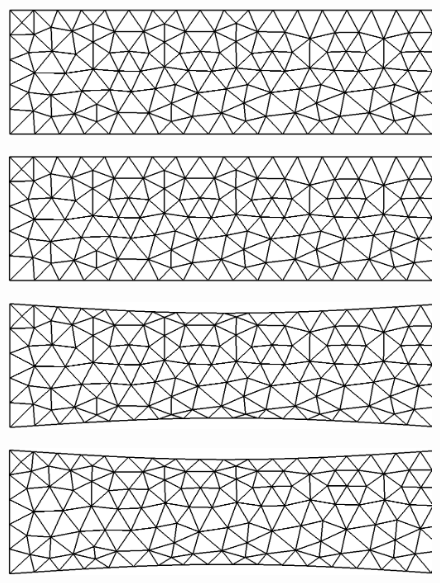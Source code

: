 \begin{figure}[H]
     \begin{minipage}{.50\linewidth}
      \centering
      \includegraphics[scale=0.19]{./02_chaps/cap_numerico/figure/no1.png}\\
     \end{minipage}%
     \begin{minipage}{.50\linewidth}
      \centering
      \includegraphics[scale=0.19]{./02_chaps/cap_numerico/figure/with1.png}\\
     \end{minipage}
     \begin{minipage}{.50\linewidth}
     \medskip
      \centering
      \includegraphics[scale=0.19]{./02_chaps/cap_numerico/figure/no2.png}\\
     \end{minipage}%
     \begin{minipage}{.50\linewidth}
     \medskip
      \centering
      \includegraphics[scale=0.19]{./02_chaps/cap_numerico/figure/with2.png}\\

\end{minipage}
\end{figure}
